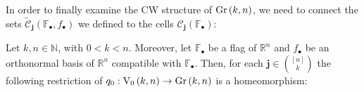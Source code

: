In order to finally examine the CW structure of $\Gr{k}{n}$, we need to connect the sets $\tilde{\mathcal{C}}_{\mathbf{j}}(\mathbb{F}_{\bullet},f_{\bullet})$ we defined to the cells $\mathcal{C}_{\mathbf{j}}(\mathbb{F}_{\bullet})$:
\begin{lemma}\label{lem:cells_from_stiefel_to_gr} Let $k,n\in\mathbb{N}$, with $0<k<n$. Moreover, let $\mathbb{F}_{\bullet}$ be a flag of $\mathbb{R}^n$ and $f_{\bullet}$ be an orthonormal basis of $\mathbb{R}^n$ compatible with $\mathbb{F}_{\bullet}$. Then, for each $\mathbf{j}\in\binom{[n]}{k}$ the following restriction of $q_0:\StO{k}{n}\to\Gr{k}{n}$ is a homeomorphism:
\begin{center}
\end{center}
\end{lemma}
